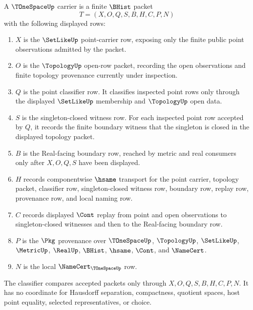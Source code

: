 \begin{definition}\label{def:t1-space-carrier}
A $\TOneSpaceUp$ carrier is a finite $\BHist$ packet
$$
T=(X,O,Q,S,B,H,C,P,N)
$$
with the following displayed rows:
\begin{enumerate}
\item $X$ is the $\SetLikeUp$ point-carrier row, exposing only the finite public point observations admitted by the packet.
\item $O$ is the $\TopologyUp$ open-row packet, recording the open observations and finite topology provenance currently under inspection.
\item $Q$ is the point classifier row. It classifies inspected point rows only through the displayed $\SetLikeUp$ membership and $\TopologyUp$ open data.
\item $S$ is the singleton-closed witness row. For each inspected point row accepted by $Q$, it records the finite boundary witness that the singleton is closed in the displayed topology packet.
\item $B$ is the Real-facing boundary row, reached by metric and real consumers only after $X,O,Q,S$ have been displayed.
\item $H$ records componentwise $\hsame$ transport for the point carrier, topology packet, classifier row, singleton-closed witness row, boundary row, replay row, provenance row, and local naming row.
\item $C$ records displayed $\Cont$ replay from point and open observations to singleton-closed witnesses and then to the Real-facing boundary row.
\item $P$ is the $\Pkg$ provenance over $\TOneSpaceUp$, $\TopologyUp$, $\SetLikeUp$, $\MetricUp$, $\RealUp$, $\BHist$, $\hsame$, $\Cont$, and $\NameCert$.
\item $N$ is the local $\NameCert_{\TOneSpaceUp}$ row.
\end{enumerate}
The classifier compares accepted packets only through $X,O,Q,S,B,H,C,P,N$. It has no coordinate for Hausdorff separation, compactness, quotient spaces, host point equality, selected representatives, or choice.
\end{definition}

